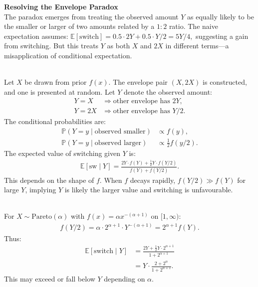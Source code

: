 \begin{technical}
{\Large\textbf{Resolving the Envelope Paradox}}\\[0.3em]

The paradox emerges from treating the observed amount $Y$ as equally likely to be the smaller or larger of two amounts related by a $1:2$ ratio. The naive expectation assumes: $
\mathbb{E}[\text{switch}] = 0.5 \cdot 2Y + 0.5 \cdot Y/2 = 5Y/4,$ suggesting a gain from switching. But this treats $Y$ as both $X$ and $2X$ in different terms—a misapplication of conditional expectation.

\\[0.2em]
Let $X$ be drawn from prior $f(x)$. The envelope pair $(X, 2X)$ is constructed, and one is presented at random. Let $Y$ denote the observed amount:
\begin{align*}
Y = X &\Rightarrow \text{other envelope has } 2Y,\\
Y = 2X &\Rightarrow \text{other envelope has } Y/2.
\end{align*}
The conditional probabilities are:
\begin{align*}
\mathbb{P}(Y=y \mid \text{observed smaller}) &\propto f(y), \\
\mathbb{P}(Y=y \mid \text{observed larger}) &\propto \tfrac{1}{2} f(y/2).
\end{align*}
The expected value of switching given $Y$ is:
\begin{align*}
\mathbb{E}[\text{sw} \mid Y] 
= \frac{2Y \cdot f(Y) + \tfrac{1}{2}Y \cdot f(Y/2)}{f(Y) + f(Y/2)}.
\end{align*}
This depends on the shape of $f$. When $f$ decays rapidly, $f(Y/2) \gg f(Y)$ for large $Y$, implying $Y$ is likely the larger value and switching is unfavourable.

\\[0.2em]
For $X \sim \text{Pareto}(\alpha)$ with $f(x) = \alpha x^{-(\alpha + 1)}$ on $[1, \infty)$:
\begin{align*}
f(Y/2) = \alpha \cdot 2^{\alpha + 1} \cdot Y^{-(\alpha + 1)} = 2^{\alpha + 1} f(Y).
\end{align*}
Thus:
\begin{align*}
\mathbb{E}[\text{switch} \mid Y] &= \frac{2Y + \tfrac{1}{2}Y \cdot 2^{\alpha + 1}}{1 + 2^{\alpha + 1}}\\
&= Y \cdot \frac{2 + 2^{\alpha}}{1 + 2^{\alpha + 1}}.
\end{align*}
This may exceed or fall below $Y$ depending on $\alpha$.


\end{technical}
